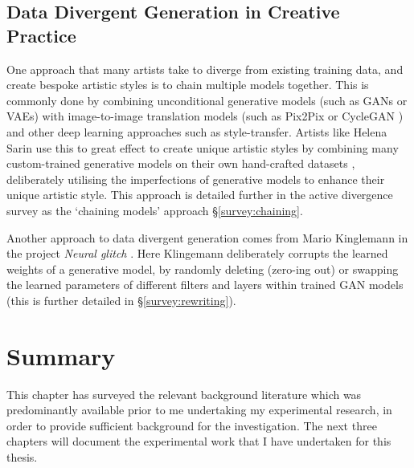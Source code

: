 \subsection{Data Divergent Generation in Creative Practice}
\label{c2:subsec:divergent-practice}

One approach that many artists take to diverge from existing training data, and create bespoke artistic styles is to chain multiple models together. 
This is commonly done by combining unconditional generative models (such as GANs or VAEs) with image-to-image translation models (such as Pix2Pix \citep{isola2017image} or CycleGAN \citep{zhu2017unpaired}) and other deep learning approaches such as style-transfer.
Artists like Helena Sarin use this to great effect to create unique artistic styles by combining many custom-trained generative models on their own hand-crafted datasets \citep{sarin2018playing}, deliberately utilising the imperfections of generative models to enhance their unique artistic style. 
This approach is detailed further in the active divergence survey as the `chaining models' approach \S \ref{survey:chaining}.

Another approach to data divergent generation comes from Mario Kinglemann in the project \textit{Neural glitch} \citep{klingemann2018neural}. 
Here Klingemann deliberately corrupts the learned weights of a generative model, by randomly deleting (zero-ing out) or swapping the learned parameters of different filters and layers within trained GAN models (this is further detailed in \S \ref{survey:rewriting}). 


\section{Summary}

This chapter has surveyed the relevant background literature which was predominantly available prior to me undertaking my experimental research, in order to provide sufficient background for the investigation.
The next three chapters will document the experimental work that I have undertaken for this thesis.

